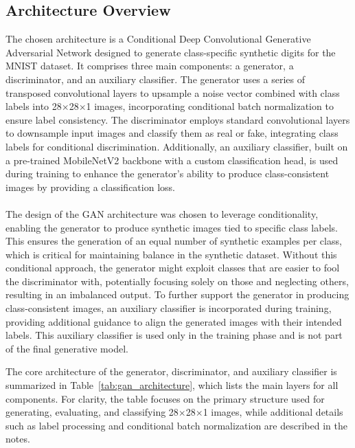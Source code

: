 \documentclass[12pt]{article}
\begin{document}
\subsection{Architecture Overview}
\label{subsec:architecture_overview}
The chosen architecture is a Conditional Deep Convolutional Generative Adversarial Network designed to generate class-specific synthetic digits for the MNIST dataset. It comprises three main components: a generator, a discriminator, and an auxiliary classifier. The generator uses a series of transposed convolutional layers to upsample a noise vector combined with class labels into 28$\times$28$\times$1 images, incorporating conditional batch normalization to ensure label consistency. The discriminator employs standard convolutional layers to downsample input images and classify them as real or fake, integrating class labels for conditional discrimination. Additionally, an auxiliary classifier, built on a pre-trained MobileNetV2 backbone with a custom classification head, is used during training to enhance the generator’s ability to produce class-consistent images by providing a classification loss.
\\
\\
The design of the GAN architecture was chosen to leverage conditionality, enabling the generator to produce synthetic images tied to specific class labels. This ensures the generation of an equal number of synthetic examples per class, which is critical for maintaining balance in the synthetic dataset. Without this conditional approach, the generator might exploit classes that are easier to fool the discriminator with, potentially focusing solely on those and neglecting others, resulting in an imbalanced output. To further support the generator in producing class-consistent images, an auxiliary classifier is incorporated during training, providing additional guidance to align the generated images with their intended labels. This auxiliary classifier is used only in the training phase and is not part of the final generative model.

The core architecture of the generator, discriminator, and auxiliary classifier is summarized in Table~\ref{tab:gan_architecture}, which lists the main layers for all components. For clarity, the table focuses on the primary structure used for generating, evaluating, and classifying 28$\times$28$\times$1 images, while additional details such as label processing and conditional batch normalization are described in the notes.
\end{document}
